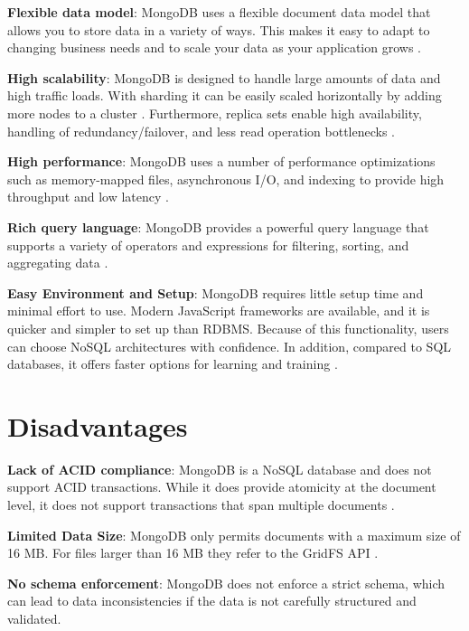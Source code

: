 \textbf{Flexible data model}: MongoDB uses a flexible document data model that allows you to store data in a variety of ways. This makes it easy to adapt to changing business needs and to scale your data as your application grows \parencite{mongodb-datamodels, knowledgenile-pro-con}.

\textbf{High scalability}: MongoDB is designed to handle large amounts of data and high traffic loads. With sharding it can be easily scaled horizontally by adding more nodes to a cluster \parencite{mongodb-scalability, dataflair_2018}. Furthermore, replica sets enable high availability, handling of redundancy/failover, and less read operation bottlenecks \parencite{mongodb-replica-sets}.

\textbf{High performance}: MongoDB uses a number of performance optimizations such as memory-mapped files, asynchronous I/O, and indexing to provide high throughput and low latency \parencite{mongodb-performance, knowledgenile-pro-con}.

\textbf{Rich query language}: MongoDB provides a powerful query language that supports a variety of operators and expressions for filtering, sorting, and aggregating data \parencite{mongodb-query}.

\textbf{Easy Environment and Setup}: MongoDB requires little setup time and minimal effort to use. Modern JavaScript frameworks are available, and it is quicker and simpler to set up than \ac{RDBMS}.
Because of this functionality, users can choose NoSQL architectures with confidence. In addition, compared to SQL databases, it offers faster options for learning and training \parencite{knowledgenile-pro-con, jamsheer_2019}.

\section{Disadvantages}

\textbf{Lack of ACID compliance}: MongoDB is a \ac{NoSQL} database and does not support \ac{ACID} transactions. While it does provide atomicity at the document level, it does not support transactions that span multiple documents \parencite{mongodb-transactions, knowledgenile-pro-con}.

\textbf{Limited Data Size}: MongoDB only permits documents with a maximum size of 16 MB. For files larger than 16 MB they refer to the GridFS \ac{API} \parencite{mongodb-documents}.

\textbf{No schema enforcement}: MongoDB does not enforce a strict schema, which can lead to data inconsistencies if the data is not carefully structured and validated.


